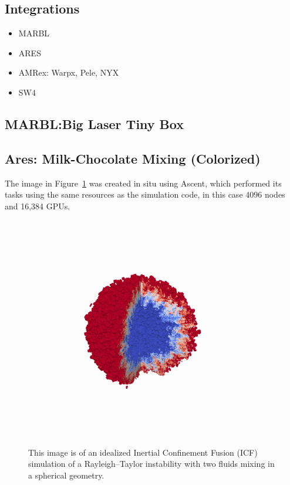 \subsection{Integrations}

\begin{itemize}
\item MARBL
\item ARES
\item AMRex: Warpx, Pele, NYX
\item SW4
\end{itemize}



\subsection{MARBL:Big Laser Tiny Box}

\subsection{Ares: Milk-Chocolate Mixing (Colorized)}

The image in Figure~\ref{img:icf} was created in situ using
Ascent, which performed its tasks using
the same resources as the simulation code, in this
case 4096 nodes and 16,384 GPUs.

\begin{figure}
\centering
\includegraphics[trim={ 0 8cm 0 7cm},width=0.9\textwidth]{images/mixing_ball}
\caption{\label{img:icf}
This image is of an idealized Inertial Confinement
Fusion (ICF) simulation of a Rayleigh–Taylor instability
with two fluids mixing in a spherical geometry.
}
\end{figure}
